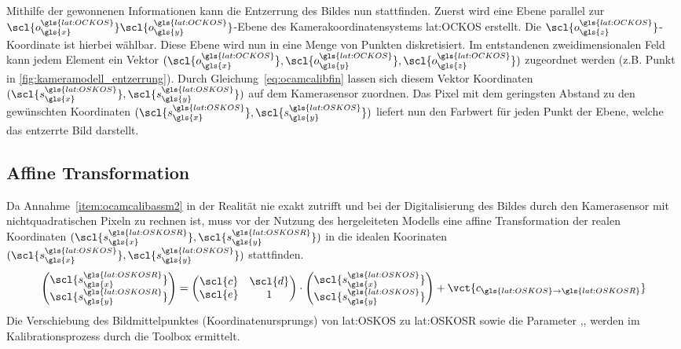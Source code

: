 Mithilfe der gewonnenen Informationen kann die Entzerrung des Bildes nun stattfinden. Zuerst wird eine Ebene parallel zur \(\scl{o^{\gls{lat:OCKOS}}_{\gls{x}}}\scl{o^{\gls{lat:OCKOS}}_{\gls{y}}}\)-Ebene des Kamerakoordinatensystems \gls{lat:OCKOS} erstellt. Die \(\scl{o^{\gls{lat:OCKOS}}_{\gls{z}}}\)-Koordinate ist hierbei wählbar. Diese Ebene wird nun in eine Menge von Punkten diskretisiert. Im entstandenen zweidimensionalen Feld kann jedem Element ein Vektor \((\scl{o^{\gls{lat:OCKOS}}_{\gls{x}}}, \scl{o^{\gls{lat:OCKOS}}_{\gls{y}}}, \scl{o^{\gls{lat:OCKOS}}_{\gls{z}}})\) zugeordnet werden  (z.B. Punkt  in \ref{fig:kameramodell_entzerrung}). Durch Gleichung~\eqref{eq:ocamcalibfin} lassen sich diesem Vektor Koordinaten \((\scl{s^{\gls{lat:OSKOS}}_{\gls{x}}}, \scl{s^{\gls{lat:OSKOS}}_{\gls{y}}})\) auf dem Kamerasensor zuordnen. Das Pixel mit dem geringsten Abstand zu den gewünschten Koordinaten \((\scl{s^{\gls{lat:OSKOS}}_{\gls{x}}}, \scl{s^{\gls{lat:OSKOS}}_{\gls{y}}})\) liefert nun den Farbwert für jeden Punkt der Ebene, welche das entzerrte Bild darstellt.

\subsection{Affine Transformation}
Da Annahme~\ref{item:ocamcalibassm2} in der Realität nie exakt zutrifft und bei der Digitalisierung des Bildes durch den Kamerasensor mit nichtquadratischen Pixeln zu rechnen ist, muss vor der Nutzung des hergeleiteten Modells eine affine Transformation der realen Koordinaten \((\scl{s^{\gls{lat:OSKOSR}}_{\gls{x}}}, \scl{s^{\gls{lat:OSKOSR}}_{\gls{y}}})\) in die idealen Koorinaten \((\scl{s^{\gls{lat:OSKOS}}_{\gls{x}}}, \scl{s^{\gls{lat:OSKOS}}_{\gls{y}}})\) stattfinden.
\begin{equation}
\begin{pmatrix}
\scl{s^{\gls{lat:OSKOSR}}_{\gls{x}}} \\ \scl{s^{\gls{lat:OSKOSR}}_{\gls{y}}}
\end{pmatrix}
=
\begin{pmatrix}
\scl{c} & \scl{d} \\
\scl{e} & 1 
\end{pmatrix}
\cdot
\begin{pmatrix}
\scl{s^{\gls{lat:OSKOS}}_{\gls{x}}} \\ \scl{s^{\gls{lat:OSKOS}}_{\gls{y}}}
\end{pmatrix}
+
\vct{c_{\gls{lat:OSKOS}\rightarrow\gls{lat:OSKOSR}}}
\end{equation}
 Die Verschiebung des Bildmittelpunktes (Koordinatenursprungs) von \gls{lat:OSKOS} zu \gls{lat:OSKOSR}  sowie die Parameter ,, werden im Kalibrationsprozess durch die Toolbox ermittelt.



